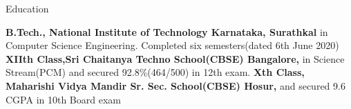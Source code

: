 \begin{rubric}{Education}

\entry*[2017 -- 2020]%
	\textbf{B.Tech., National Institute of Technology Karnataka, Surathkal} in Computer Science Engineering. Completed six semesters(dated 6th June 2020)
%
\entry*[2015 -- 2017]%
	\textbf{XIIth Class,Sri Chaitanya Techno School(CBSE) Bangalore,} in  Science Stream(PCM) and secured 92.8\%(464/500) in 12th exam.
%
\entry*[2003-2015]%
	\textbf{Xth Class, Maharishi Vidya Mandir Sr. Sec. School(CBSE) Hosur,} and secured 9.6 CGPA in 10th Board exam
\end{rubric}